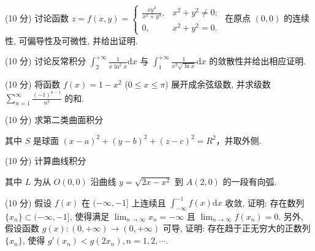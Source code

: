 (10 分) 讨论函数 $z = f(x, y) = \begin{cases} \frac{xy^3}{x^2 + y^4}, & x^2 + y^2 \neq 0; \\ 0, & x^2 + y^2 = 0. \end{cases}$ 在原点 $(0, 0)$ 的连续性, 可偏导性及可微性, 并给出证明.\par
(10 分) 讨论反常积分 $\int_{2}^{+\infty} \frac{1}{x \ln^2 x} \mathrm{d}x$ 与 $\int_{1}^{+\infty} \frac{1}{x^2 \sqrt{\ln x}} \mathrm{d}x$ 的敛散性并给出相应证明.\par
(10 分) 将函数 $f(x) = 1 - x^2$ ($0 \leq x \leq \pi$) 展开成余弦级数, 并求级数 $\sum_{n=1}^{\infty} \frac{(-1)^{n-1}}{n^2}$ 的和.\par
\par{}
(10 分) 求第二类曲面积分\par
\nopagebreak[4]
其中 $S$ 是球面 $(x - a)^2 + (y - b)^2 + (z - c)^2 = R^2$，并取外侧.\par
\par{}
(10 分) 计算曲线积分\par
\nopagebreak[4]
其中 $L$ 为从 $O(0,0)$ 沿曲线 $y = \sqrt{2x - x^2}$ 到 $A(2,0)$ 的一段有向弧.\par
(10 分) 假设 $f(x)$ 在 $(- \infty, -1]$ 上连续且 $\int_{-\infty}^{-1} f(x) \mathrm{d}x$ 收敛, 证明: 存在数列 $\{x_n\} \subset (-\infty, -1]$, 使得满足 $\lim_{n \to \infty} x_n = -\infty$ 且 $\lim_{n \to \infty} f(x_n) = 0$. 另外, 假设函数 $g(x): (0, +\infty) \to (0, +\infty)$ 可导, 证明: 存在趋于正无穷大的正数列 $\{x_n\}$, 使得 $g'(x_n) < g(2x_n), n = 1, 2, \cdots$.\par
